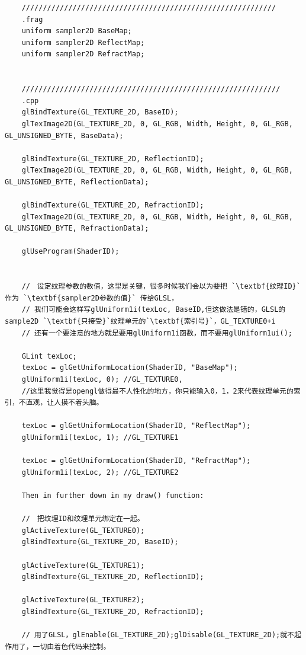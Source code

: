 \documentclass[UTF8,a4paper,12pt]{ctexbook}
\begin{document}
				\begin{lstlisting}
	////////////////////////////////////////////////////////////				
	.frag
	uniform sampler2D BaseMap;  
	uniform sampler2D ReflectMap;  
	uniform sampler2D RefractMap;  			
				
				
	/////////////////////////////////////////////////////////////			
	.cpp
	glBindTexture(GL_TEXTURE_2D, BaseID);
	glTexImage2D(GL_TEXTURE_2D, 0, GL_RGB, Width, Height, 0, GL_RGB, GL_UNSIGNED_BYTE, BaseData);
	 
	glBindTexture(GL_TEXTURE_2D, ReflectionID);
	glTexImage2D(GL_TEXTURE_2D, 0, GL_RGB, Width, Height, 0, GL_RGB, GL_UNSIGNED_BYTE, ReflectionData);
	 
	glBindTexture(GL_TEXTURE_2D, RefractionID);
	glTexImage2D(GL_TEXTURE_2D, 0, GL_RGB, Width, Height, 0, GL_RGB, GL_UNSIGNED_BYTE, RefractionData);
	 
	glUseProgram(ShaderID);
	 
	 
	//　设定纹理参数的数值，这里是关键，很多时候我们会以为要把 `\textbf{纹理ID}` 作为 `\textbf{sampler2D参数的值}` 传给GLSL，
	// 我们可能会这样写glUniform1i(texLoc, BaseID,但这做法是错的，GLSL的sample2D `\textbf{只接受}`纹理单元的`\textbf{索引号}`，GL_TEXTURE0+i
	// 还有一个要注意的地方就是要用glUniform1i函数，而不要用glUniform1ui();
	 
	GLint texLoc;
	texLoc = glGetUniformLocation(ShaderID, "BaseMap");
	glUniform1i(texLoc, 0); //GL_TEXTURE0,
	//这里我觉得是opengl做得最不人性化的地方，你只能输入0，1，2来代表纹理单元的索引，不直观，让人摸不着头脑。
	 
	texLoc = glGetUniformLocation(ShaderID, "ReflectMap");
	glUniform1i(texLoc, 1); //GL_TEXTURE1
	 
	texLoc = glGetUniformLocation(ShaderID, "RefractMap");
	glUniform1i(texLoc, 2); //GL_TEXTURE2
	 
	Then in further down in my draw() function:
	 
	//　把纹理ID和纹理单元绑定在一起。
	glActiveTexture(GL_TEXTURE0);
	glBindTexture(GL_TEXTURE_2D, BaseID);
	 
	glActiveTexture(GL_TEXTURE1);
	glBindTexture(GL_TEXTURE_2D, ReflectionID);
	 
	glActiveTexture(GL_TEXTURE2);
	glBindTexture(GL_TEXTURE_2D, RefractionID);
	 
	// 用了GLSL，glEnable(GL_TEXTURE_2D);glDisable(GL_TEXTURE_2D);就不起作用了，一切由着色代码来控制。
				\end{lstlisting}
				
				
\end{document}
